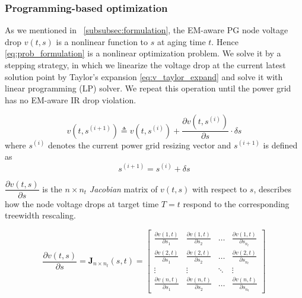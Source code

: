 \subsubsection{Programming-based optimization}
\label{subsubsec:slp_framework}

As we mentioned in ~\ref{subsubsec:formulation}, the EM-aware PG node voltage drop $v(t,s)$ is a nonlinear function to $s$ at aging time $t$. Hence \eqref{eq:prob_formulation} is a nonlinear optimization problem. 
We solve it by a stepping strategy, in which we linearize the voltage drop at the current latest solution point by Taylor's expansion \eqref{eq:v_taylor_expand} and solve it with linear programming (LP) solver. We repeat this operation until the power grid has no EM-aware IR drop violation.

\begin{equation}
	\label{eq:v_taylor_expand}
	v(t, s^{(i+1)}) \triangleq v(t,s^{(i)}) + \dfrac{\partial v(t, s^{(i)})}{\partial s} \cdot \delta s
\end{equation}
where $s^{(i)}$ denotes the current power grid resizing vector and $s^{(i+1)}$ is defined as 
\begin{equation}
	\label{eq:s}
	s^{(i+1)} = s^{(i)} + \delta s 
\end{equation}

$ \dfrac{\partial v(t, s)}{\partial s}$ is the $n\times n_{t}$ \textit{Jacobian} matrix of $v(t,s)$ with respect to $s$, describes how the node voltage drops at target time $T=t$ respond to the corresponding treewidth rescaling.

\begin{equation}
	\label{eq:J_matrix}
	\dfrac{\partial v(t, s)}{\partial s}=
	\mathbf {J}_{n\times n_{t}}(s,t) =
	\begin{bmatrix}
		\frac{\partial v(1,t)}{\partial s_{1}}&\frac{\partial v(1,t)}{\partial s_{2}}&\ldots&\frac{\partial v(1,t)}{\partial s_{n_{t}}}\\
		\frac{\partial v(2,t)}{\partial s_{1}}&\frac{\partial v(2,t)}{\partial s_{2}}&\ldots&\frac{\partial v(2,t)}{\partial s_{n_{t}}}\\
		\vdots&\vdots&\ddots&\vdots\\
		\frac{\partial v(n,t)}{\partial s_{1}}&\frac{\partial v(n,t)}{\partial s_{2}}&\ldots&\frac{\partial v(n,t)}{\partial s_{n_{t}}}
	\end{bmatrix}
\end{equation}



